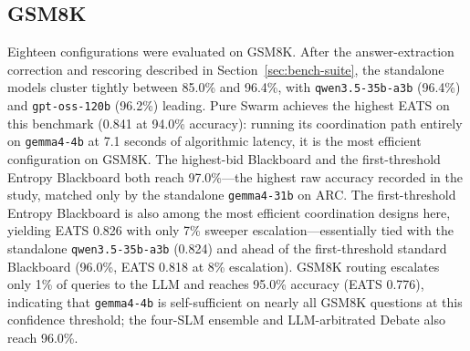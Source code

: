 \subsection{GSM8K}

Eighteen configurations were evaluated on GSM8K. After the answer-extraction correction and rescoring described in Section~\ref{sec:bench-suite}, the standalone models cluster tightly between 85.0\% and 96.4\%, with \texttt{qwen3.5-35b-a3b} (96.4\%) and \texttt{gpt-oss-120b} (96.2\%) leading. Pure Swarm achieves the highest EATS on this benchmark (0.841 at 94.0\% accuracy): running its coordination path entirely on \texttt{gemma4-4b} at 7.1 seconds of algorithmic latency, it is the most efficient configuration on GSM8K. The highest-bid Blackboard and the first-threshold Entropy Blackboard both reach 97.0\%---the highest raw accuracy recorded in the study, matched only by the standalone \texttt{gemma4-31b} on ARC. The first-threshold Entropy Blackboard is also among the most efficient coordination designs here, yielding EATS 0.826 with only 7\% sweeper escalation---essentially tied with the standalone \texttt{qwen3.5-35b-a3b} (0.824) and ahead of the first-threshold standard Blackboard (96.0\%, EATS 0.818 at 8\% escalation). GSM8K routing escalates only 1\% of queries to the LLM and reaches 95.0\% accuracy (EATS 0.776), indicating that \texttt{gemma4-4b} is self-sufficient on nearly all GSM8K questions at this confidence threshold; the four-SLM ensemble and LLM-arbitrated Debate also reach 96.0\%.

